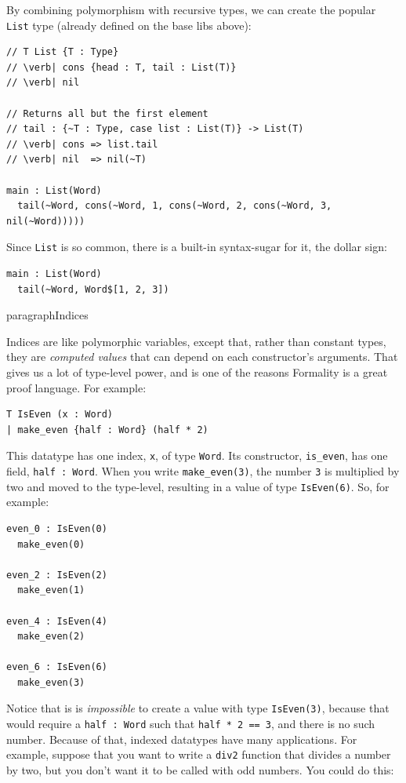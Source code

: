 \documentclass{article}
\theoremstyle{definition}
\theoremstyle{theorem}
\begin{document}
By combining polymorphism with recursive types, we can create the popular
\verb|List| type (already defined on the base libs above):

\begin{lstlisting}
// T List {T : Type}
// \verb| cons {head : T, tail : List(T)}
// \verb| nil

// Returns all but the first element
// tail : {~T : Type, case list : List(T)} -> List(T)
// \verb| cons => list.tail
// \verb| nil  => nil(~T)

main : List(Word)
  tail(~Word, cons(~Word, 1, cons(~Word, 2, cons(~Word, 3, nil(~Word)))))
\end{lstlisting}

Since \verb|List| is so common, there is a built-in syntax-sugar for it, the
dollar sign:

\begin{lstlisting}
main : List(Word)
  tail(~Word, Word$[1, 2, 3])
\end{lstlisting}

paragraph{Indices}

Indices are like polymorphic variables, except that, rather than constant types,
they are \emph{computed values} that can depend on each constructor's arguments.
That gives us a lot of type-level power, and is one of the reasons Formality is
a great proof language. For example:

\begin{lstlisting}
T IsEven (x : Word)
| make_even {half : Word} (half * 2)
\end{lstlisting}

This datatype has one index, \verb|x|, of type \verb|Word|. Its constructor,
\verb|is_even|, has one field, \verb|half : Word|. When you write
\verb|make_even(3)|, the number \verb|3| is multiplied by two and moved to the
type-level, resulting in a value of type \verb|IsEven(6)|. So, for example:

\begin{lstlisting}
even_0 : IsEven(0)
  make_even(0)

even_2 : IsEven(2)
  make_even(1)

even_4 : IsEven(4)
  make_even(2)

even_6 : IsEven(6)
  make_even(3)
\end{lstlisting}

Notice that is is \emph{impossible} to create a value with type
\verb|IsEven(3)|, because that would require a \verb|half : Word| such that
\verb|half * 2 == 3|, and there is no such number. Because of that, indexed
datatypes have many applications. For example, suppose that you want to write a
\verb|div2| function that divides a number by two, but you don't want it to be
called with odd numbers. You could do this:
\end{document}
